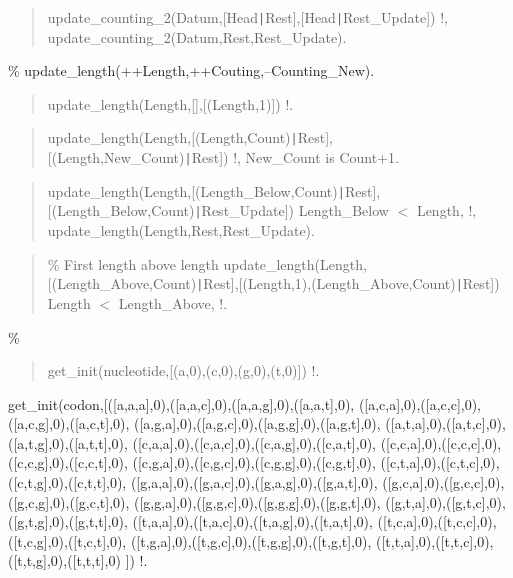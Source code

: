 \begin{quote}
update_counting_2(Datum,[Head{\tt\string|}Rest],[Head{\tt\string|}Rest_Update]) \Sneck{}
!,
update_counting_2(Datum,Rest,Rest_Update).
\end{quote}

\% update_length(++Length,++Couting,--Counting_New).

\begin{quote}
update_length(Length,[],[(Length,1)]) \Sneck{}
!.
\end{quote}

\begin{quote}
update_length(Length,[(Length,Count){\tt\string|}Rest],[(Length,New_Count){\tt\string|}Rest]) \Sneck{}
!,
New_Count is Count+1.
\end{quote}

\begin{quote}
update_length(Length,[(Length_Below,Count){\tt\string|}Rest],[(Length_Below,Count){\tt\string|}Rest_Update]) \Sneck{}
Length_Below $<$ Length,
!,
update_length(Length,Rest,Rest_Update).
\end{quote}

\begin{quote}
\% First length above length
update_length(Length,[(Length_Above,Count){\tt\string|}Rest],[(Length,1),(Length_Above,Count){\tt\string|}Rest]) \Sneck{}
Length $<$ Length_Above,
!.
\end{quote}

\% 

\begin{quote}
get_init(nucleotide,[(a,0),(c,0),(g,0),(t,0)]) \Sneck{}
!.
\end{quote}

\begin{center}
get_init(codon,[([a,a,a],0),([a,a,c],0),([a,a,g],0),([a,a,t],0),
([a,c,a],0),([a,c,c],0),([a,c,g],0),([a,c,t],0),
([a,g,a],0),([a,g,c],0),([a,g,g],0),([a,g,t],0),
([a,t,a],0),([a,t,c],0),([a,t,g],0),([a,t,t],0),
([c,a,a],0),([c,a,c],0),([c,a,g],0),([c,a,t],0),
([c,c,a],0),([c,c,c],0),([c,c,g],0),([c,c,t],0),
([c,g,a],0),([c,g,c],0),([c,g,g],0),([c,g,t],0),
([c,t,a],0),([c,t,c],0),([c,t,g],0),([c,t,t],0),
([g,a,a],0),([g,a,c],0),([g,a,g],0),([g,a,t],0),
([g,c,a],0),([g,c,c],0),([g,c,g],0),([g,c,t],0),
([g,g,a],0),([g,g,c],0),([g,g,g],0),([g,g,t],0),
([g,t,a],0),([g,t,c],0),([g,t,g],0),([g,t,t],0),
([t,a,a],0),([t,a,c],0),([t,a,g],0),([t,a,t],0),
([t,c,a],0),([t,c,c],0),([t,c,g],0),([t,c,t],0),
([t,g,a],0),([t,g,c],0),([t,g,g],0),([t,g,t],0),
([t,t,a],0),([t,t,c],0),([t,t,g],0),([t,t,t],0)
]) \Sneck{}
!.
\end{center}

